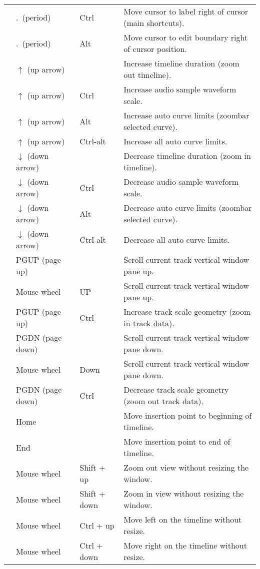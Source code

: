 \begin{longtable}[h]{>{\bfseries}p{}p{}p{}p{}}
  & .\ (period) & Ctrl & Move cursor to label right of cursor (main shortcuts). \\
  & .\ (period) & Alt & Move cursor to edit boundary right of cursor position. \\
  & $\uparrow$ (up arrow) &  & Increase timeline duration (zoom out timeline). \\
  & $\uparrow$ (up arrow) & Ctrl & Increase audio sample waveform scale. \\
  & $\uparrow$ (up arrow) & Alt & Increase auto curve limits (zoombar selected curve). \\
  & $\uparrow$ (up arrow) & Ctrl-alt & Increase all auto curve limits. \\
  & $\downarrow$ (down arrow) &  & Decrease timeline duration (zoom in timeline). \\
  & $\downarrow$ (down arrow) & Ctrl & Decrease audio sample waveform scale. \\
  & $\downarrow$ (down arrow) & Alt & Decrease auto curve limits (zoombar selected curve). \\
  & $\downarrow$ (down arrow) & Ctrl-alt & Decrease all auto curve limits. \\
  & PGUP (page up) &  & Scroll current track vertical window pane up. \\
  & Mouse wheel & UP & Scroll current track vertical window pane up. \\
  & PGUP (page up) & Ctrl & Increase track scale geometry (zoom in track data). \\
  & PGDN (page down) &  & Scroll current track vertical window pane down. \\
  & Mouse wheel & Down & Scroll current track vertical window pane down. \\
  & PGDN (page down) & Ctrl & Decrease track scale geometry (zoom out track data). \\
  & Home &  & Move insertion point to beginning of timeline. \\
  & End &  & Move insertion point to end of timeline. \\
  & Mouse wheel & Shift + up & Zoom out view without resizing the window. \\
  & Mouse wheel & Shift + down & Zoom in view without resizing the window. \\
  & Mouse wheel & Ctrl + up & Move left on the timeline without resize. \\
  & Mouse wheel & Ctrl + down & Move right on the timeline without resize. \\

\end{longtable}
